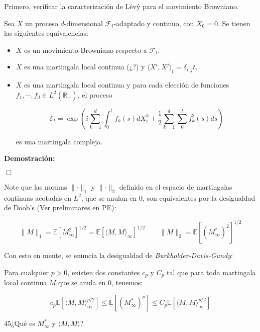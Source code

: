 Primero, verificar la caracterización de Lévŷ para el movimiento Browniano.

\begin{theorem}[Lévy]
	Sea $X$ un proceso $d$-dimensional $\mathcal{F}_t$-adaptado y continuo, con $X_0 = 0$. Se tienen las siguientes equivalencias:

	\begin{itemize}

		\item $X$ es un movimiento Browniano respecto a $\mathcal{F}_t$.

		\item $X$ es una martingala local continua (¿?) y $\langle X^i, X^j \rangle_t = \delta_{i,j} t$.

		\item $X$ es una martingala local continua y para cada elección de funciones $f_1, \cdots, f_d \in L^2 (\mathbb{R}_+)$, el proceso

		\[
			\mathcal{E}_t = \exp \left( i \sum_{k = 1}^d \int_0^t f_k (s) dX^k_s + \frac{1}{2} \sum_{k=1}^d \sum_0^t f^2_k(s) ds \right)
		\]

		es una martingala compleja.
	
	\end{itemize}

\end{theorem}

\textbf{Demostración:}

\begin{flushright}
	$\Box$
\end{flushright}

Note que las normas $\lVert \cdot \rVert_1$ y $\lVert \cdot \rVert_2$ definido en el espacio de martingalas continuas acotadas en $L^2$, que se anulan en $0$, son equivalentes por la desigualdad de Doob's (Ver preliminares en PE):

\[
	\lVert M \rVert_1 = \mathbb{E}[M^2_{\infty}]^{1/2} = \mathbb{E}[ \langle  M, M \rangle_{\infty}]^{1/2} \qquad \lVert M \rVert_2 = \mathbb{E}[ (M^*_{\infty})^2 ]^{1/2}
\]

Con esto en mente, se enuncia la desigualdad de \textit{Burkholder-Davis-Gundy}:

\begin{theorem} 
Para cualquier $p > 0$, existen dos constantes $c_p$ y $C_p$ tal que para toda martingala local continua $M$ que se anula en $0$, tenemos:

\[
	c_p \mathbb{E}[ \langle M,M \rangle_{\infty}^{p/2} ] \leq \mathbb{E}[ (M^*_{\infty})^p ] \leq C_p \mathbb{E}[ \langle M,M \rangle_{\infty}^{p/2} ]
\]

\end{theorem}

45¿Qué es $M^*_{\infty}$ y $\langle M,M \rangle$?


